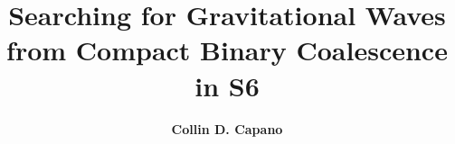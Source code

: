 \documentclass[12pt,notitlepage]{report}
\begin{document}
\title{%
Searching for Gravitational Waves from Compact Binary Coalescence in S6
}
\author{\bf Collin D. Capano}

\label{ch:far}

\end{document}
